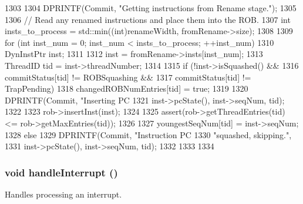\begin{DoxyCode}
1303 {
1304     DPRINTF(Commit, "Getting instructions from Rename stage.\n");
1305 
1306     // Read any renamed instructions and place them into the ROB.
1307     int insts_to_process = std::min((int)renameWidth, fromRename->size);
1308 
1309     for (int inst_num = 0; inst_num < insts_to_process; ++inst_num) {
1310         DynInstPtr inst;
1311 
1312         inst = fromRename->insts[inst_num];
1313         ThreadID tid = inst->threadNumber;
1314 
1315         if (!inst->isSquashed() &&
1316             commitStatus[tid] != ROBSquashing &&
1317             commitStatus[tid] != TrapPending) {
1318             changedROBNumEntries[tid] = true;
1319 
1320             DPRINTF(Commit, "Inserting PC %
1321                     inst->pcState(), inst->seqNum, tid);
1322 
1323             rob->insertInst(inst);
1324 
1325             assert(rob->getThreadEntries(tid) <= rob->getMaxEntries(tid));
1326 
1327             youngestSeqNum[tid] = inst->seqNum;
1328         } else {
1329             DPRINTF(Commit, "Instruction PC %
1330                     "squashed, skipping.\n",
1331                     inst->pcState(), inst->seqNum, tid);
1332         }
1333     }
1334 }
\end{DoxyCode}
\hypertarget{classDefaultCommit_a1cb72a248a56b5dc2b2ed27db7560b90}{
\subsubsection[{handleInterrupt}]{\setlength{\rightskip}{0pt plus 5cm}void handleInterrupt ()}}
\label{classDefaultCommit_a1cb72a248a56b5dc2b2ed27db7560b90}
Handles processing an interrupt. 


